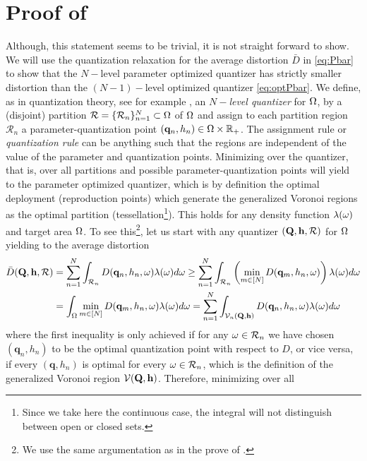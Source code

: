 \documentclass[12pt,onecolumn,final,letterpaper]{IEEEtran}
\newcounter{example}[section]
\renewcommand{\vp}{\mathbf q}
\renewcommand{\vP}{\mathbf Q}
\newcommand{\Vor}{\ensuremath{\mathcal{V}}}         %
\newcommand{\Rset}{\ensuremath{\mathcal R}}
\newcommand{\Dis}{\ensuremath{D}}                    %
\newcommand{\AvDis}{\ensuremath{\bar{\Dis}}}         %
\begin{document}
\section{Proof of }\label{app:proof_lemma_active}
  Although, this statement seems to be trivial, it is not straight forward to show.  We will use the quantization
  relaxation for the average distortion $\AvDis$ in \eqref{eq:Pbar} to  show that the $N-$level parameter optimized
  quantizer has strictly smaller distortion than the $(N-1)-$level optimized quantizer \eqref{eq:optPbar}. We define, as
  in quantization theory, see for example \cite{GN98}, an \emph{$N-$level quantizer} for $\Omega$, by a (disjoint)
  partition $\Rset=\{\Rset_n\}_{n=1}^N\subset \Ome$ of $\Omega$ and assign to each partition region $\Rset_n$ a
  parameter-quantization point $(\vp_n,h_n)\in\Ome\times\R_+$. The assignment rule or \emph{quantization rule} can be
  anything such that the regions are independent of the value of the parameter and quantization points.  Minimizing over
  the quantizer, that is, over all partitions and possible parameter-quantization points will yield to the parameter
  optimized quantizer, which is by definition the optimal deployment (reproduction points) which generate the
  generalized Voronoi regions as the optimal partition (tessellation\footnote{Since we take here the continuous case,
    the integral will not distinguish between open or closed sets.}). This holds for any density function $\lambda(\omega)$
    and target area $\Omega$.  To see this\footnote{We use the same argumentation as in the prove of
      \cite[Prop.1]{KJ17}.}, let us start with any quantizer $(\vP,\vh,\Rset)$ for $\Omega$ yielding to the average
      distortion 
  \begin{align}
    \AvDis(\vP,\vh,\Rset) &=\sum_{n=1}^N \int_{\Rset_n} \Dis(\vp_n,h_n,\ome)\lam(\ome) d\ome \geq \sum_{n=1}^N \int_{\Rset_n} 
    \left(\min_{m\in[N]} \Dis(\vp_m,h_n,\ome) \right) \lam(\ome)d\ome\notag\\
    &=\int_{\Ome} \min_{m\in[N]} \Dis(\vp_m,h_n,\ome) \lam(\ome)d\ome
    =\sum_{n=1}^N \int_{\Vor_n(\vP,\vh)} \Dis(\vp_n,h_n,\ome) \lam(\ome)d\ome
  \end{align} 
  where the first inequality is only achieved if for any $\ome\in \Rset_n$ we have chosen $(\vp_n,h_n)$ to be the
  optimal quantization point with respect to $\Dis$, or vice versa, if every $(\vp,h_n)$ is optimal for every $\ome\in
  \Rset_n$, which is the definition of the generalized Voronoi region $\Vor(\vP,\vh)$. Therefore, minimizing over all
\end{document}
